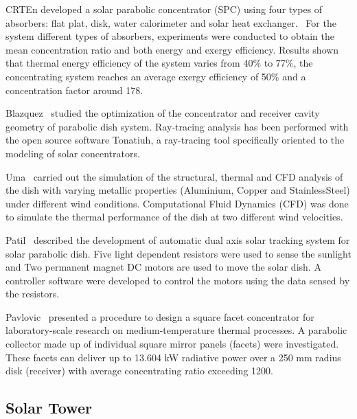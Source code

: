 CRTEn developed a solar parabolic concentrator (SPC) using four types of absorbers: flat plat, disk, water calorimeter and solar heat exchanger.~\cite{Skouri2013} For the system different types of absorbers, experiments were conducted to obtain the mean concentration ratio and both energy and exergy efficiency. Results shown that thermal energy efficiency of the system varies from 40\% to 77\%, the concentrating system reaches an average exergy efficiency of 50\% and a concentration factor around 178.

Blazquez~\cite{Blazquez2016} studied the optimization of the concentrator and receiver cavity geometry of parabolic dish system. Ray-tracing analysis has been performed with the open source software Tonatiuh, a ray-tracing tool specifically oriented to the modeling of solar concentrators.

Uma~\cite{Uma2015} carried out the simulation of the structural, thermal and CFD analysis of the dish with varying metallic properties (Aluminium, Copper and StainlessSteel) under different wind conditions. Computational Fluid Dynamics (CFD) was done to simulate the thermal performance of the dish at two different wind velocities.

Patil~\cite{Patil2016} described the development of automatic dual axis solar tracking system for solar parabolic dish. Five light dependent resistors were used to sense the sunlight and Two permanent magnet DC motors are used to move the solar dish. A controller software were developed to control the motors using the data sensed by the resistors.

Pavlovic~\cite{Pavlovic2014} presented a procedure to design a square facet concentrator for laboratory-scale research on medium-temperature thermal processes. A parabolic collector made up of individual square mirror panels (facets) were investigated. These facets can deliver up to 13.604 kW radiative power over a 250 mm radius disk (receiver) with average concentrating ratio exceeding 1200.

\subsection{Solar Tower}\label{sec:st}


